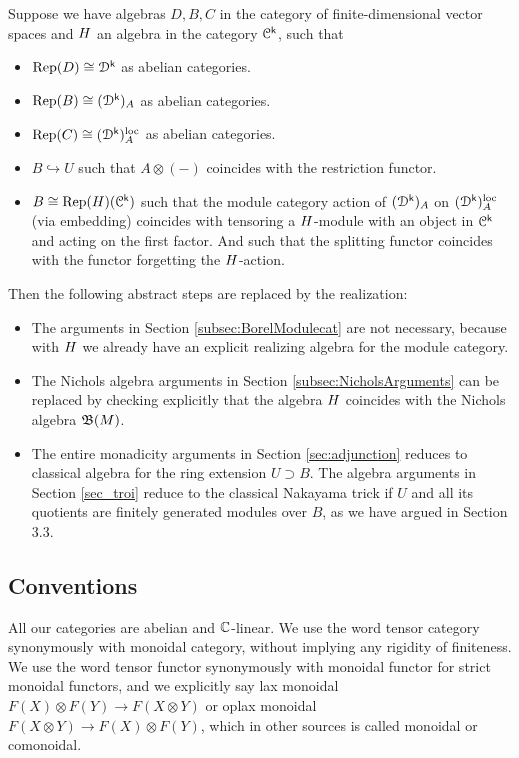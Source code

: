 \documentclass[a4paper, reqno]{amsart}
\theoremstyle{introTheorems}
\newcommand\cC{\mathcal{C}}
\newcommand\cD{\mathcal{D}}
\newcommand\Rep{\textup{Rep}}
\newcommand\loc{\textup{loc}}
\renewcommand{\1}{\mathbbold{1}}
\begin{document}
\bigskip

Suppose we have algebras $D,B,C$ in the category of finite-dimensional vector spaces and $H$ an algebra in the category $\cC^\k$, such that 
\begin{itemize}
\item $\Rep(D)\cong \cD^\k$ as abelian categories.
\item $\Rep(B)\cong (\cD^\k)_A$ as abelian categories.
\item $\Rep(C)\cong (\cD^\k)_A^\loc$ as abelian categories.
\item $B\hookrightarrow U$ such that $A\otimes (-)$ coincides with the restriction functor.
\item $B\cong \Rep(\Nichols)(\cC^\k)$ such that the module category action of $(\cD^\k)_A$ on $(\cD^\k)_A^\loc$ (via embedding) coincides with tensoring a $H$-module with an object in $\cC^\k$ and acting on the first factor. And such that the splitting functor coincides with the functor forgetting the $H$-action.   
\end{itemize}
Then the following abstract steps are replaced by the realization:
\begin{itemize}
    \item The arguments in Section \ref{subsec:BorelModulecat} are not necessary, because with $H$ we already have an explicit realizing algebra for the module category.
    \item The Nichols algebra arguments in Section \ref{subsec:NicholsArguments} can be replaced by checking explicitly that the algebra $H$
    coincides with the Nichols algebra $\mathfrak{B}(M)$.
    \item The entire monadicity arguments in Section \ref{sec:adjunction} reduces to classical algebra for the ring extension $U\supset B$. The algebra arguments in Section \ref{sec_troi} reduce to the classical Nakayama trick if $U$ and all its quotients are finitely generated modules over $B$, as we have argued in \cite{CLR23} Section 3.3.
\end{itemize}


\subsection{Conventions}

All our categories are abelian and $\mathbb{C}$-linear. We use the word tensor category synonymously with monoidal category, without implying any rigidity of finiteness. We use the word tensor functor synonymously with  monoidal functor for strict monoidal functors, and we explicitly say lax monoidal $F(X)\otimes F(Y)\to F(X\otimes Y)$ or oplax monoidal $F(X\otimes Y)\to F(X)\otimes F(Y)$, which in other sources is called monoidal or comonoidal.   
\end{document}
